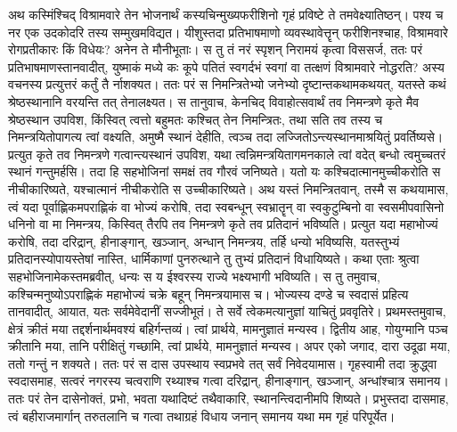 \adhyAya
{}
\vakya अथ कस्मिंश्चिद् विश्रामवारे तेन भोजनार्थं कस्यचिन्मुख्यफरीशिनो गृहं प्रविष्टे ते तमवेक्ष्यातिष्ठन्।
\vakya पश्य च नर एक उदकोदरि तस्य सम्मुखमविद्यत।
\vakya यीशुस्तदा प्रतिभाषमाणो व्यवस्थावेत्तॄन् फरीशिनश्चाह, विश्रामवारे रोगप्रतीकारः किं विधेयः?
\vakya अनेन ते मौनीभूताः। स तु तं नरं स्पृशन् निरामयं कृत्वा विससर्ज, ततः परं प्रतिभाषमाणस्तानवादीत्, युष्माकं मध्ये कः कूपे पतितं स्वगर्दभं स्वगां वा तत्क्षणं विश्रामवारे नोद्धरति?
\vakya अस्य वचनस्य प्रत्युत्तरं कर्तुं तै र्नाशक्यत।
\vakya ततः परं स निमन्त्रितेभ्यो जनेभ्यो दृष्टान्तकथामकथयत्, यतस्ते कथं श्रेष्ठस्थानानि वरयन्ति तत् तेनालक्ष्यत।
\vakya स तानुवाच, केनचिद् विवाहोत्सवार्थं तव निमन्त्रणे कृते मैव श्रेष्ठस्थान उपविश, किंस्वित् त्वत्तो बहुमतः कश्चित् तेन निमन्त्रितः,
\vakya तथा सति तव तस्य च निमन्त्रयितोपागत्य त्वां वक्ष्यति, अमुष्मै स्थानं देहीति, त्वञ्च तदा लज्जितोऽन्त्यस्थानमाश्रयितुं प्रवर्तिष्यसे।
\vakya प्रत्युत कृते तव निमन्त्रणे गत्वान्त्यस्थानं उपविश, यथा त्वन्निमन्त्रयितागमनकाले त्वां वदेत् बन्धो त्वमुच्चतरं स्थानं गन्तुमर्हसि। तदा हि सहभोजिनां समक्षं तव गौरवं जनिष्यते।
\vakya यतो यः कश्चिदात्मानमुच्चीकरोति स नीचीकारिष्यते, यश्चात्मानं नीचीकरोति स उच्चीकारिष्यते।
\vakya अथ यस्तं निमन्त्रितवान्, तस्मै स कथयामास, त्वं यदा पूर्वाह्णिकमपराह्णिकं वा भोज्यं करोषि, तदा स्वबन्धून् स्वभ्रातॄन् वा स्वकुटुम्बिनो वा स्वसमीपवासिनो धनिनो वा मा निमन्त्रय, किस्वित् तैरपि तव निमन्त्रणे कृते तव प्रतिदानं भविष्यति।
\vakya प्रत्युत यदा महाभोज्यं करोषि, तदा दरिद्रान्, हीनाङ्गान्, खञ्जान्, अन्धान् निमन्त्रय,
\vakya तर्हि धन्यो भविष्यसि, यतस्तुभ्यं प्रतिदानस्योपायस्तेषां नास्ति, धार्मिकाणां पुनरुत्थाने तु तुभ्यं प्रतिदानं विधायिष्यते।
\vakya कथा एताः श्रुत्वा सहभोजिनामेकस्तमब्रवीत्, धन्यः स य ईश्वरस्य राज्ये भक्ष्यभागी भविष्यति।
\vakya स तु तमुवाच, कश्चिन्मनुष्योऽपराह्णिकं महाभोज्यं चक्रे बहून् निमन्त्रयामास च।
\vakya भोज्यस्य दण्डे च स्वदासं प्रहित्य तानवादीत्, आयात, यतः सर्वमेवेदानीं सज्जीभूतं।
\vakya ते सर्वे त्वेकमत्यानुज्ञां याचितुं प्रववृतिरे। प्रथमस्तमुवाच, क्षेत्रं क्रीतं मया तद्दर्शनार्थमवश्यं बहिर्गन्तव्यं। त्वां प्रार्थये, मामनुज्ञातं मन्यस्व।
\vakya द्वितीय आह, गोयुग्मानि पञ्च क्रीतानि मया, तानि परीक्षितुं गच्छामि, त्वां प्रार्थये, मामनुज्ञातं मन्यस्व।
\vakya अपर एको जगाद, दारा उदूढा मया, ततो गन्तुं न शक्यते।
\vakya ततः परं स दास उपस्थाय स्वप्रभवे तत् सर्वं निवेदयामास। गृहस्वामी तदा क्रुद्ध्वा स्वदासमाह, सत्वरं नगरस्य चत्वराणि रथ्याश्च गत्वा दरिद्रान्, हीनाङ्गान्, खञ्जान्, अन्धांश्चात्र समानय।
\vakya ततः परं तेन दासेनोक्तं, प्रभो, भवता यथादिष्टं तथैवाकारि, स्थानन्त्विदानीमपि शिष्यते।
\vakya प्रभुस्तदा दासमाह, त्वं बहीराजमार्गान् तरुतलानि च गत्वा तथाग्रहं विधाय जनान् समानय यथा मम गृहं परिपूर्येत।
